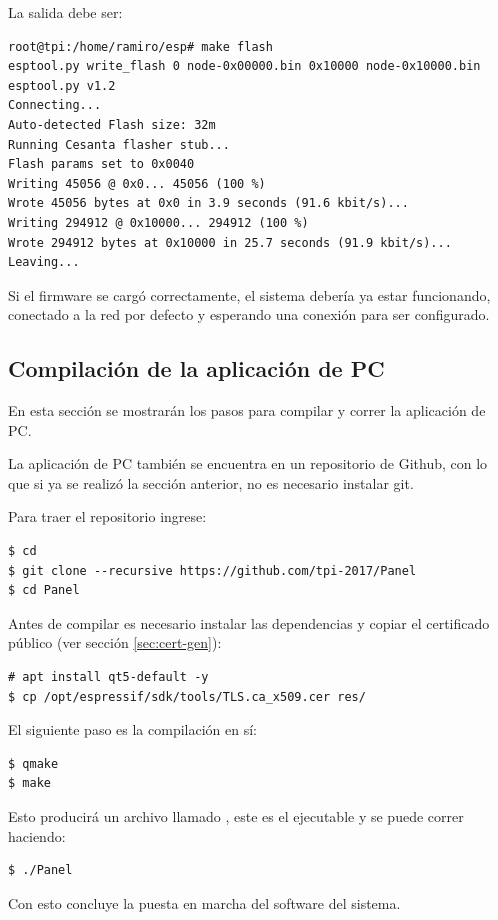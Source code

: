 La salida debe ser:
\begin{lstlisting}
root@tpi:/home/ramiro/esp# make flash
esptool.py write_flash 0 node-0x00000.bin 0x10000 node-0x10000.bin
esptool.py v1.2
Connecting...
Auto-detected Flash size: 32m
Running Cesanta flasher stub...
Flash params set to 0x0040
Writing 45056 @ 0x0... 45056 (100 %)
Wrote 45056 bytes at 0x0 in 3.9 seconds (91.6 kbit/s)...
Writing 294912 @ 0x10000... 294912 (100 %)
Wrote 294912 bytes at 0x10000 in 25.7 seconds (91.9 kbit/s)...
Leaving...
\end{lstlisting}

Si el firmware se cargó correctamente, el sistema debería ya estar funcionando, conectado a la red por defecto y esperando una conexión para ser configurado.

\subsection{Compilación de la aplicación de PC}
En esta sección se mostrarán los pasos para compilar y correr la aplicación de PC.

La aplicación de PC también se encuentra en un repositorio de Github, con lo que si ya se realizó la sección anterior, no es necesario instalar git.

Para traer el repositorio ingrese:
\begin{lstlisting}
$ cd
$ git clone --recursive https://github.com/tpi-2017/Panel
$ cd Panel
\end{lstlisting}

Antes de compilar es necesario instalar las dependencias y copiar el certificado público (ver sección \ref{sec:cert-gen}):

\begin{lstlisting}
# apt install qt5-default -y
$ cp /opt/espressif/sdk/tools/TLS.ca_x509.cer res/
\end{lstlisting}

El siguiente paso es la compilación en sí:

\begin{lstlisting}
$ qmake
$ make
\end{lstlisting}

Esto producirá un archivo llamado , este es el ejecutable y se puede correr haciendo:

\begin{lstlisting}
$ ./Panel
\end{lstlisting}

Con esto concluye la puesta en marcha del software del sistema.

